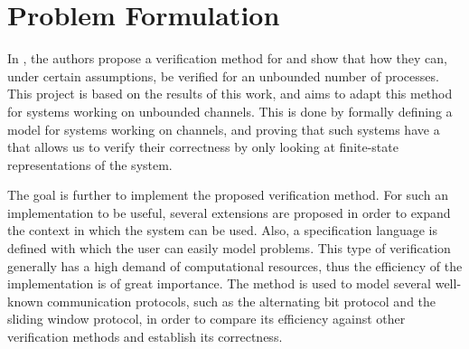 
\section{Problem Formulation}
In \cite{parosh}, the authors propose a verification method for  and show that how they can, under certain assumptions, be verified for an unbounded number of processes. This project is based on the results of this work, and aims to adapt this method for systems working on unbounded channels. This is done by formally defining a model for systems working on channels, and proving that such systems have a  that allows us to verify their correctness by only looking at finite-state representations of the system.

The goal is further to implement the proposed verification method. For such an implementation to be useful, several extensions are proposed in order to expand the context in which the system can be used. Also, a specification language is defined with which the user can easily model problems. This type of verification generally has a high demand of computational resources, thus the efficiency of the implementation is of great importance. The method is used to model several well-known communication protocols, such as the alternating bit protocol and the sliding window protocol, in order to compare its efficiency against other verification methods and establish its correctness.

